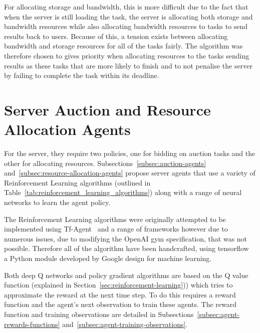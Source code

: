 For allocating storage and bandwidth, this is more difficult due to the fact that when the server is still
loading the task, the server is allocating both storage and bandwidth resources while also allocating bandwidth
resources to tasks to send results back to users. Because of this, a tension exists between allocating bandwidth and
storage resources for all of the tasks fairly. The algorithm was therefore chosen to gives priority when allocating
resources to the tasks sending results as these tasks that are more likely to finish and to not penalise the
server by failing to complete the task within its deadline.

\section{Server Auction and Resource Allocation Agents}
\label{sec:server-auction-and-resource-allocation-agents}
For the server, they require two policies, one for bidding on auction tasks and the other for allocating resources.
Subsections~\ref{subsec:auction-agents} and~\ref{subsec:resource-allocation-agents} propose server agents that use
a variety of Reinforcement Learning algorithms (outlined in Table~\ref{tab:reinforcement_learning_algorithms}) along
with a range of neural networks to learn the agent policy.

The Reinforcement Learning algorithms were originally attempted to be implemented using Tf-Agent~\citep{tf-agent} and a
range of frameworks however due to numerous issues, due to modifying the OpenAI gym specification, that was not
possible. Therefore all of the algorithm have been handcrafted, using tensorflow~\citep{tensorflow2015-whitepaper} a
Python module developed by Google design for machine learning.

Both deep Q networks and policy gradient algorithms are based on the Q value function (explained in
Section~\ref{sec:reinforcement-learning})) which tries to approximate the reward at the next time step. To do
this requires a reward function and the agent's next observation to train these agents. The reward function and training
observations are detailed in Subsections~\ref{subsec:agent-rewards-functions} and~\ref{subsec:agent-training-observations}.


